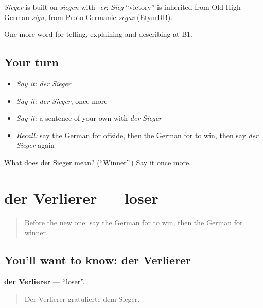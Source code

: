 \begin{cousinweb}
\emph{Sieger} is built on \emph{siegen} with \emph{-er}; \emph{Sieg} \textquotedblleft{}victory\textquotedblright{} is inherited from Old High German \emph{sigu}, from Proto-Germanic \emph{segaz} (EtymDB).
\end{cousinweb}

\begin{grammarlens}[title={What you've built}]
One more word for telling, explaining and describing at B1.
\end{grammarlens}

\subsection*{Your turn}
\begin{itemize}
\raggedright
  \item \emph{Say it:} \emph{der Sieger}
  \item \emph{Say it:} \emph{der Sieger}, once more
  \item \emph{Say it:} a sentence of your own with \emph{der Sieger}
  \item \emph{Recall:} say the German for offside, then the German for to win, then say \emph{der Sieger} again
\end{itemize}

\begin{tcolorbox}[breakable,colback=teal!4,colframe=teal!35!black,title={Before you move on}]
What does der Sieger mean? (\textquotedblleft{}Winner\textquotedblright{}.) Say it once more.
\end{tcolorbox}
\section[der Verlierer]{der Verlierer — loser}

\label{lesson:GE-C508-verlierer}



\begin{quote}
Before the new one: say the German for to win, then the German for winner.
\end{quote}

\subsection*{You'll want to know: der Verlierer}
\textbf{der Verlierer} — \textquotedblleft{}loser\textquotedblright{}.

\begin{quote}
Der Verlierer gratulierte dem Sieger.
\end{quote}

